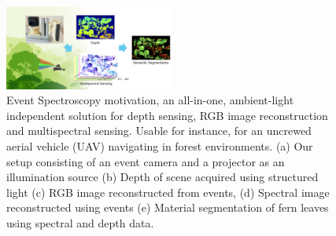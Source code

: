 
\begin{figure}[t]
    \includegraphics[width=0.5\textwidth]{chapters/papers/ED/resources/figures/figure_1_inspiration.pdf}
    \caption{Event Spectroscopy motivation, an all-in-one, ambient-light independent solution for depth sensing, RGB image reconstruction and multispectral sensing. Usable for instance, for an uncrewed aerial vehicle (UAV) navigating in forest environments.  (a) Our setup consisting of an event camera and a projector as an illumination source 
    (b) Depth of scene acquired using structured light (c) RGB image reconstructed from events, (d) Spectral image reconstructed using events (e) Material segmentation of fern leaves using spectral and depth data.} 
    \label{fig:eye} 
\end{figure}
